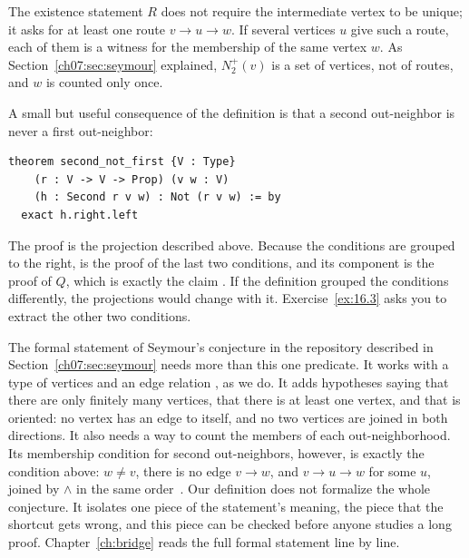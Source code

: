 The existence statement $R$ does not require the intermediate vertex to be unique; it asks for at least one route $v\to u\to w$. If several vertices $u$ give such a route, each of them is a witness for the membership of the same vertex $w$. As Section~\ref{ch07:sec:seymour} explained, $N_2^+(v)$ is a set of vertices, not of routes, and $w$ is counted only once.


A small but useful consequence of the definition is that a second out-neighbor is never a first out-neighbor:
\par\noindent\begin{minipage}{\linewidth}
\begin{lstlisting}
theorem second_not_first {V : Type}
    (r : V -> V -> Prop) (v w : V)
    (h : Second r v w) : Not (r v w) := by
  exact h.right.left
\end{lstlisting}
\end{minipage}\par
The proof is the projection described above. Because the conditions are grouped to the right,  is the proof of the last two conditions, and its  component is the proof of $Q$, which is exactly the claim . If the definition grouped the conditions differently, the projections would change with it. Exercise~\ref{ex:16.3} asks you to extract the other two conditions.

The formal statement of Seymour's conjecture in the repository described in Section~\ref{ch07:sec:seymour} needs more than this one predicate. It works with a type  of vertices and an edge relation , as we do. It adds hypotheses saying that there are only finitely many vertices, that there is at least one vertex, and that  is oriented: no vertex has an edge to itself, and no two vertices are joined in both directions. It also needs a way to count the members of each out-neighborhood. Its membership condition for second out-neighbors, however, is exactly the condition above: $w\ne v$, there is no edge $v\to w$, and $v\to u\to w$ for some $u$, joined by $\land$ in the same order~\cite{oai173}. Our definition does not formalize the whole conjecture. It isolates one piece of the statement's meaning, the piece that the shortcut gets wrong, and this piece can be checked before anyone studies a long proof. Chapter~\ref{ch:bridge} reads the full formal statement line by line.
